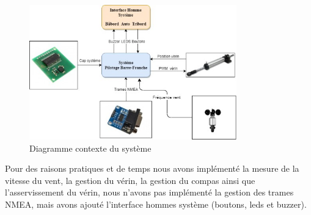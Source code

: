 \begin{figure}[h]
  \begin{center}
    \includegraphics[width=0.8\textwidth]{images/Barre_franche.jpg}
    \caption{Diagramme contexte du système}
  \end{center}
\end{figure} 

\newpage 

Pour des raisons pratiques et de temps nous avons implémenté la mesure de la vitesse du vent, la gestion du vérin, la gestion du compas ainsi que l'asservissement du vérin, nous n'avons pas implémenté la gestion des trames NMEA, mais avons ajouté l'interface hommes système (boutons, leds et buzzer).

